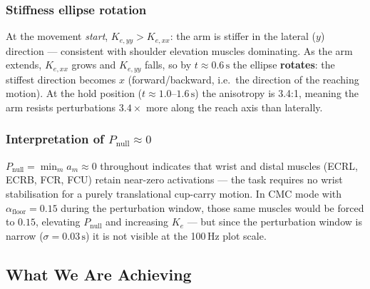 \documentclass[11pt,a4paper]{article}
\begin{document}
\subsubsection{Stiffness ellipse rotation}

At the movement \emph{start}, $K_{e,yy}>K_{e,xx}$: the arm is stiffer in the
lateral ($y$) direction — consistent with shoulder elevation muscles dominating.
As the arm extends, $K_{e,xx}$ grows and $K_{e,yy}$ falls, so by $t\approx0.6\,\text{s}$
the ellipse \textbf{rotates}: the stiffest direction becomes $x$ (forward/backward,
i.e.\ the direction of the reaching motion).  At the hold position
($t\approx1.0\text{--}1.6\,\text{s}$) the anisotropy is 3.4:1, meaning the arm
resists perturbations $3.4\times$ more along the reach axis than laterally.

\subsubsection{Interpretation of $P_\text{null}\approx 0$}

$P_\text{null}=\min_m a_m \approx 0$ throughout indicates that wrist and
distal muscles (ECRL, ECRB, FCR, FCU) retain near-zero activations — the task
requires no wrist stabilisation for a purely translational cup-carry motion.
In CMC mode with $\alpha_\text{floor}=0.15$ during the perturbation window,
those same muscles would be forced to $0.15$, elevating $P_\text{null}$ and
increasing $K_e$ — but since the perturbation window is narrow ($\sigma=0.03\,\text{s}$)
it is not visible at the 100\,Hz plot scale.

\subsection{What We Are Achieving}
\end{document}

